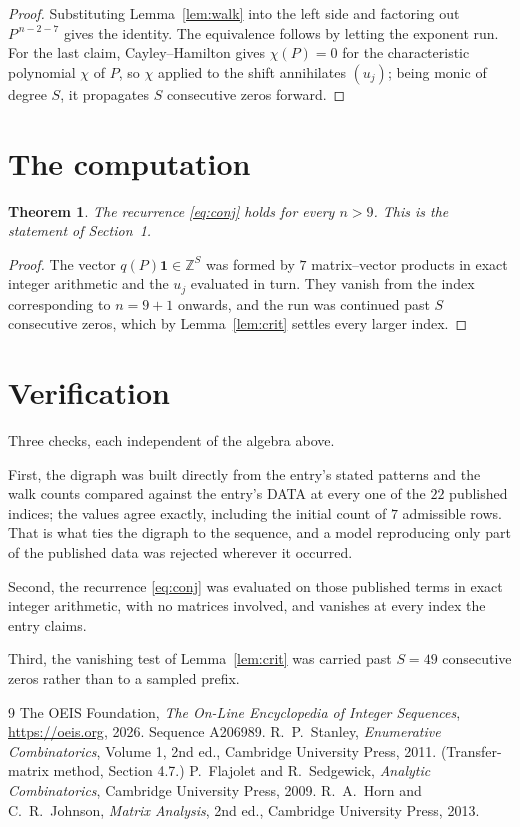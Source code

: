 \documentclass[11pt,a4paper]{article}
\theoremstyle{plain}
\newtheorem{theorem}{Theorem}
\theoremstyle{definition}
\begin{document}
\begin{proof}
Substituting Lemma~\ref{lem:walk} into the left side and factoring out
$P^{\,n-2-7}$ gives the identity. The equivalence follows by letting the exponent
run. For the last claim, Cayley--Hamilton gives $\chi(P)=0$ for the characteristic
polynomial $\chi$ of $P$, so $\chi$ applied to the shift annihilates $(u_j)$; being monic of
degree $S$, it propagates $S$ consecutive zeros forward.
\end{proof}

\section{The computation}

\begin{theorem}
The recurrence \eqref{eq:conj} holds for every $n>9$. This is the statement of
Section~1.
\end{theorem}

\begin{proof}
The vector $q(P)\mathbf{1}\in\mathbb{Z}^{S}$ was formed by $7$ matrix--vector
products in exact integer arithmetic and the $u_j$ evaluated in turn. They vanish from the
index corresponding to $n=9+1$ onwards, and the run was continued past $S$ consecutive
zeros, which by Lemma~\ref{lem:crit} settles every larger index.
\end{proof}

\section{Verification}

Three checks, each independent of the algebra above.

First, the digraph was built directly from the entry's stated patterns and the walk counts
compared against the entry's DATA at every one of the $22$ published indices; the
values agree exactly, including the initial count of $7$ admissible rows. That is
what ties the digraph to the sequence, and a model reproducing only part of the published
data was rejected wherever it occurred.

Second, the recurrence \eqref{eq:conj} was evaluated on those published terms in exact
integer arithmetic, with no matrices involved, and vanishes at every index the entry claims.

Third, the vanishing test of Lemma~\ref{lem:crit} was carried past $S=49$ consecutive
zeros rather than to a sampled prefix.

\begin{thebibliography}{9}
 The OEIS Foundation, \emph{The On-Line Encyclopedia of Integer
Sequences}, \url{https://oeis.org}, 2026. Sequence A206989.
 R.~P.~Stanley, \emph{Enumerative Combinatorics}, Volume 1, 2nd ed.,
Cambridge University Press, 2011. (Transfer-matrix method, Section 4.7.)
 P.~Flajolet and R.~Sedgewick, \emph{Analytic Combinatorics}, Cambridge
University Press, 2009.
 R.~A.~Horn and C.~R.~Johnson, \emph{Matrix Analysis}, 2nd ed., Cambridge
University Press, 2013.
\end{thebibliography}
\end{document}
